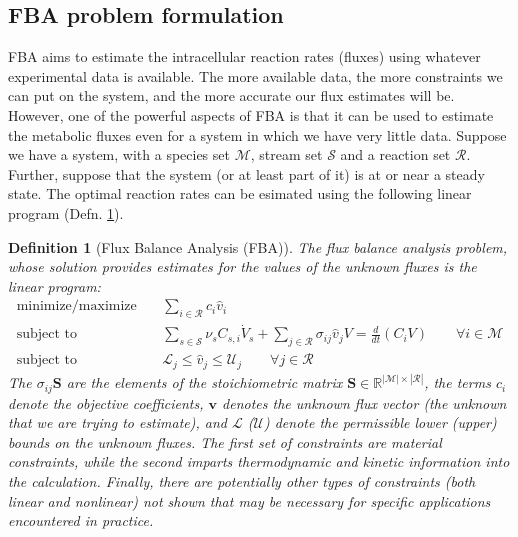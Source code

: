 \documentclass{article}[11pt]
\newtheorem{defn}{Definition}
\def\R{\mathbb{R}}
\begin{document}
\subsection{FBA problem formulation}
FBA aims to estimate the intracellular reaction rates (fluxes) using whatever experimental data is available.
The more available data, the more constraints we can put on the system, and the more accurate our flux estimates will be.
However, one of the powerful aspects of FBA is that it can be used to estimate the metabolic fluxes even for a system in which we have very little data.
Suppose we have a system, with a species set $\mathcal{M}$, stream set $\mathcal{S}$ and a reaction set $\mathcal{R}$. 
Further, suppose that the system (or at least part of it) is at or near a steady state. 
The optimal reaction rates can be esimated using the following linear program (Defn. \ref{defn-fba-concentration}).

\begin{mdframed}
\begin{defn}[Flux Balance Analysis (FBA)]\label{defn-fba-concentration}
The flux balance analysis problem, whose solution provides estimates for the values of the unknown fluxes is the linear program: 
\begin{eqnarray*}
\text{minimize/maximize}~& & \sum_{i\in\mathcal{R}}c_{i}\hat{v}_{i}\\
\text{subject to} & & \sum_{s\in\mathcal{S}}\nu_{s}C_{s,i}\dot{V}_{s} + \sum_{j\in\mathcal{R}}\sigma_{ij}\hat{v}_{j}V = \frac{d}{dt}\left(C_{i}V\right)\qquad\forall{i\in\mathcal{M}}\\
\text{subject to} & & \mathcal{L}_{j}\leq\hat{v}_{j}\leq\mathcal{U}_{j}\qquad\forall{j\in\mathcal{R}}
\end{eqnarray*}
The $\sigma_{ij}\mathbf{S}$ are the elements of the  stoichiometric matrix $\mathbf{S}\in\R^{|\mathcal{M}|\times|\mathcal{R}|}$, 
the terms $c_{i}$ denote the objective coefficients, 
$\mathbf{v}$ denotes the unknown flux vector (the unknown that we are trying to estimate), and 
$\mathcal{L}$ ($\mathcal{U}$) denote the permissible lower (upper) bounds on the unknown fluxes. 
The first set of constraints are material constraints, 
while the second imparts thermodynamic and kinetic information into the calculation. 
Finally, there are potentially other types of constraints (both linear and nonlinear) not shown 
that may be necessary for specific applications encountered in practice.
\end{defn}
\end{mdframed}





\end{document}
